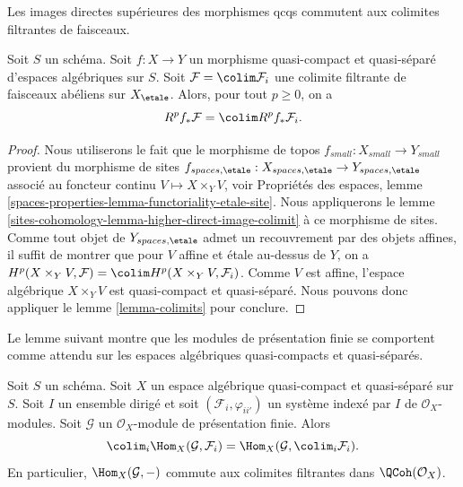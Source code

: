 \begin{lemma}
\label{lemma-colimit-cohomology}
\begin{slogan}
Les images directes supérieures des morphismes qcqs commutent aux colimites filtrantes
de faisceaux.
\end{slogan}
Soit $S$ un schéma. Soit $f : X \to Y$ un morphisme quasi-compact et quasi-séparé
d'espaces algébriques sur $S$. Soit $\mathcal{F} = \colim \mathcal{F}_i$
une colimite filtrante de faisceaux abéliens sur $X_\etale$.
Alors, pour tout $p \geq 0$, on a
$$
R^pf_*\mathcal{F} = \colim R^pf_*\mathcal{F}_i.
$$
\end{lemma}

\begin{proof}
Nous utiliserons le fait que le morphisme de topos $f_{small} : X_{small} \to Y_{small}$
provient du morphisme de sites
$f_{spaces, \etale} : X_{spaces, \etale} \to Y_{spaces, \etale}$
associé au foncteur continu $V \longmapsto X \times_Y V$,
voir Propriétés des espaces, lemme
\ref{spaces-properties-lemma-functoriality-etale-site}.
Nous appliquerons le lemme
\ref{sites-cohomology-lemma-higher-direct-image-colimit}
à ce morphisme de sites. Comme tout objet de $Y_{spaces, \etale}$
admet un recouvrement par des objets affines, il suffit de montrer que
pour $V$ affine et étale au-dessus de $Y$, on a
$H^p(X \times_Y V, \mathcal{F}) = \colim H^p(X \times_Y V, \mathcal{F}_i)$.
Comme $V$ est affine, l'espace algébrique $X \times_Y V$ est
quasi-compact et quasi-séparé.
Nous pouvons donc appliquer le lemme \ref{lemma-colimits}
pour conclure.
\end{proof}

\noindent
Le lemme suivant montre que les modules de présentation finie se comportent
comme attendu sur les espaces algébriques quasi-compacts et quasi-séparés.

\begin{lemma}
\label{lemma-finite-presentation-quasi-compact-colimit}
Soit $S$ un schéma. Soit $X$ un espace algébrique quasi-compact et quasi-séparé
sur $S$. Soit $I$ un ensemble dirigé et
soit $(\mathcal{F}_i, \varphi_{ii'})$ un système indexé par $I$
de $\mathcal{O}_X$-modules. Soit $\mathcal{G}$ un
$\mathcal{O}_X$-module de présentation finie. Alors
$$
\colim_i \Hom_X(\mathcal{G}, \mathcal{F}_i)
=
\Hom_X(\mathcal{G}, \colim_i \mathcal{F}_i).
$$
En particulier, $\Hom_X(\mathcal{G}, -)$ commute aux colimites filtrantes
dans $\QCoh(\mathcal{O}_X)$.
\end{lemma}

